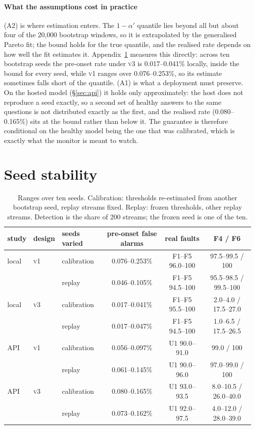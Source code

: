 \documentclass[11pt]{article}
\newcommand{\vone}{\textsc{v1}}
\newcommand{\vthree}{\textsc{v3}}
\begin{document}
\paragraph{What the assumptions cost in practice}
(A2) is where estimation enters. The $1-\alpha'$ quantile lies beyond all but
about four of the 20{,}000 bootstrap windows, so it is extrapolated by the
generalised Pareto fit; the bound holds for the true quantile, and the realised
rate depends on how well the fit estimates it. Appendix~\ref{app:seeds} measures
this directly: across ten bootstrap seeds the pre-onset rate under \vthree{} is
0.017--0.041\% locally, inside the bound for every seed, while \vone{} ranges over
0.076--0.253\%, so its estimate sometimes falls short of the quantile. (A1) is what a
deployment must preserve. On the hosted model (\S\ref{sec:api}) it holds only
approximately: the host does not reproduce a seed exactly, so a second set of
healthy answers to the same questions is not distributed exactly as the first, and
the realised rate (0.080--0.165\%) sits at the bound rather than below it. The
guarantee is therefore conditional on the healthy model being the one that was
calibrated, which is exactly what the monitor is meant to watch.

\section{Seed stability}
\label{app:seeds}
\begin{table}[t]
  \centering\small
  \caption{Ranges over ten seeds. Calibration: thresholds re-estimated from
  another bootstrap seed, replay streams fixed. Replay: frozen thresholds, other
  replay streams. Detection is the share of 200 streams; the frozen seed is one of
  the ten.}
  \label{tab:seeds}
  \setlength{\tabcolsep}{4pt}
  \begin{tabular}{lllccc}
    \toprule
    study & design & seeds varied & pre-onset false alarms & real faults & F4 / F6 \\
    \midrule
    local & \vone{} & calibration & 0.076--0.253\% & F1--F5 96.0--100 & 97.5--99.5 / 100 \\
          &         & replay      & 0.046--0.105\% & F1--F5 94.5--100 & 95.5--98.5 / 99.5--100 \\
    local & \vthree{} & calibration & 0.017--0.041\% & F1--F5 95.5--100 & 2.0--4.0 / 17.5--27.0 \\
          &           & replay      & 0.017--0.047\% & F1--F5 94.5--100 & 1.0--6.5 / 17.5--26.5 \\
    \addlinespace
    API & \vone{} & calibration & 0.056--0.097\% & U1 90.0--91.0 & 99.0 / 100 \\
        &         & replay      & 0.061--0.145\% & U1 90.0--96.0 & 97.0--99.0 / 100 \\
    API & \vthree{} & calibration & 0.080--0.165\% & U1 93.0--93.5 & 8.0--10.5 / 26.0--40.0 \\
        &           & replay      & 0.073--0.162\% & U1 92.0--97.5 & 4.0--12.0 / 28.0--39.0 \\
    \bottomrule
  \end{tabular}
\end{table}
\end{document}
